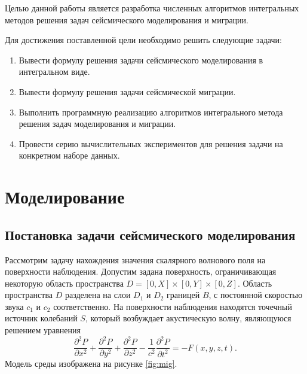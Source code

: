 \documentclass[a4paper, fontsize=14pt]{article}
\begin{document}
	
	Целью данной работы является разработка численных алгоритмов интегральных методов решения задач сейсмического моделирования и миграции. 
	
	Для достижения поставленной цели необходимо решить следующие задачи:
	\begin{enumerate}
		\item Вывести формулу решения задачи сейсмического моделирования в интегральном виде.
		\item Вывести формулу решения задачи сейсмической миграции.
		\item Выполнить программную реализацию алгоритмов интегрального метода решения задач моделирования и миграции.
		\item Провести серию вычислительных экспериментов для решения задачи на конкретном наборе данных.
	\end{enumerate}

	
	\newpage
	\section{Моделирование} 
	\subsection{Постановка задачи сейсмического моделирования} 

	Рассмотрим задачу нахождения значения скалярного волнового поля на поверхности
	наблюдения.
	Допустим задана поверхность, ограничивающая некоторую область пространства
	$D=[0,X]\times [0,Y]\times [0,Z]$.
	Область пространства $D$ разделена на слои $D_1$ и $D_2$ границей $B$, с постоянной
	скоростью звука $c_1$ и $c_2$ соответственно.
	На поверхности наблюдения находятся точечный источник колебаний $S$, который возбуждает
	акустическую волну, являющуюся решением уравнения
	\begin{equation}
		\frac{\partial^2 P}{\partial x^2} + \frac{\partial^2 P}{\partial y^2} +
		\frac{\partial^2 P}{\partial z^2} - \frac{1}{c^2} \frac{\partial^2 P}{\partial
			t^2} = -F(x,y,z,t).
		\label{eq:wav}	
	\end{equation} 
	Модель среды изображена на рисунке \ref{fig:mig}.
	
\end{document}
